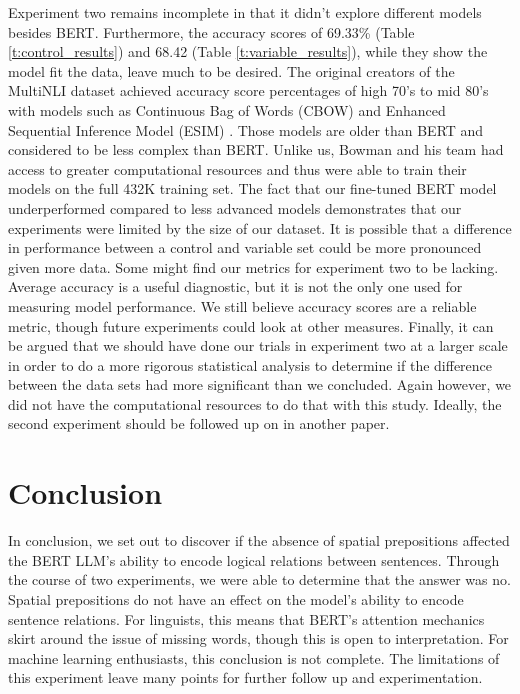 \documentclass[12pt,letterpaper]{article}
\begin{document}
Experiment two remains incomplete in that it didn't explore different models besides BERT. Furthermore, the accuracy scores of 69.33\% (Table \ref{t:control_results}) and 68.42 (Table \ref{t:variable_results}), while they show the model fit the data, leave much to be desired. The original creators of the MultiNLI dataset achieved accuracy score percentages of high 70's to mid 80's with models such as Continuous Bag of Words (CBOW) and Enhanced Sequential Inference Model (ESIM) \citep{williams_bowman_multinli}. Those models are older than BERT and considered to be less complex than BERT. Unlike us, Bowman and his team had access to greater computational resources and thus were able to train their models on the full 432K training set. The fact that our fine-tuned BERT model underperformed compared to less advanced models demonstrates that our experiments were limited by the size of our dataset. It is possible that a difference in performance between a control and variable set could be more pronounced given more data. Some might find our metrics for experiment two to be lacking. Average accuracy is a useful diagnostic, but it is not the only one used for measuring model performance. We still believe accuracy scores are a reliable metric, though future experiments could look at other measures. Finally, it can be argued that we should have done our trials in experiment two at a larger scale in order to do a more rigorous statistical analysis to determine if the difference between the data sets had more significant than we concluded. Again however, we did not have the computational resources to do that with this study. Ideally, the second experiment should be followed up on in another paper. 


\section{Conclusion}
In conclusion, we set out to discover if the absence of spatial prepositions affected the BERT LLM's ability to encode logical relations between sentences. Through the course of two experiments, we were able to determine that the answer was no. Spatial prepositions do not have an effect on the model's ability to encode sentence relations. For linguists, this means that BERT's attention mechanics skirt around the issue of missing words, though this is open to interpretation. For machine learning enthusiasts, this conclusion is not complete. The limitations of this experiment leave many points for further follow up and experimentation. 
\end{document}
